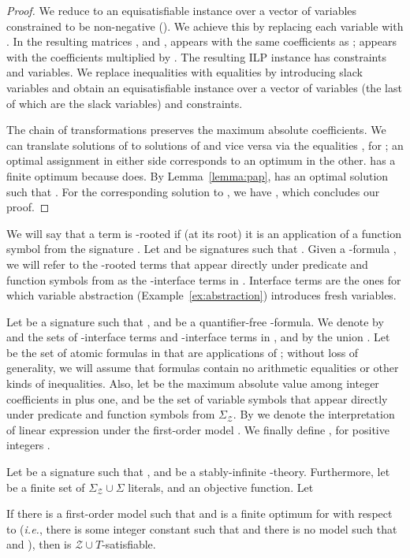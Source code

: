 \documentclass{llncs}
\newcommand{\ie}[0]{\emph{i.e.}, }
\newcommand{\ZT}[0]{\ensuremath{\mathcal{Z} \cup T}}
\newcommand{\SigmaZ}[0]{\ensuremath{\Sigma_{\mathcal{Z}}}}
\newcommand{\SigmaZT}[0]{\ensuremath{\SigmaZ{} \cup \Sigma}}
\begin{document}
\begin{proof}
  We reduce  to an equisatisfiable instance over a vector
   of  variables constrained to be non-negative
  (). We achieve this by replacing each variable
   with . In the resulting matrices , 
  and ,  appears with the same coefficients as ;  appears with the coefficients multiplied by . The
  resulting ILP instance  has  constraints and 
  variables. We replace inequalities with equalities by introducing
   slack variables and obtain an equisatisfiable instance 
  over a vector  of  variables (the last  of
  which are the slack variables) and  constraints.

  The chain of transformations preserves the maximum absolute
  coefficients. We can translate solutions of  to solutions of
   and vice versa via the equalities ,
  for ; an optimal assignment in either side
  corresponds to an optimum in the other.   has a finite optimum
  because  does. By Lemma~\ref{lemma:pap},  has an optimal
  solution  such that . For the corresponding solution  to ,
  we have , which concludes our proof.
\end{proof}

We will say that a term is -rooted if (at its root) it is an
application of a function symbol from the signature . Let
 and  be signatures such that . Given a -formula ,
we will refer to the -rooted terms that appear directly
under predicate and function symbols from  as the
-interface terms in . Interface terms are the ones for
which variable abstraction (Example~\ref{ex:abstraction}) introduces
fresh variables.

Let  be a signature such that , and  be a quantifier-free -formula. We
denote by  and  the sets of
-interface terms and -interface terms in , and by
 the union . Let 
be the set of atomic formulas in  that are applications of ;
without loss of generality, we will assume that formulas contain no
arithmetic equalities or other kinds of inequalities. Also, let
 be the maximum absolute value among integer coefficients in
 plus one, and  be the set of variable symbols that
appear directly under predicate and function symbols from
\SigmaZ{}. By  we denote the interpretation of linear expression
 under the first-order model . We finally define , for positive integers .

\begin{lemma}
  \label{lemma:ztbounds}
  Let  be a signature such that , and  be a stably-infinite -theory.
  Furthermore, let  be a finite set of \SigmaZT{} literals, and 
  an objective function. Let
  
  If there is a first-order model  such that  and  is a finite optimum for  with respect to
   (\ie there is some integer constant  such that  and there is no model  such that  and ), then  is \ZT{}-satisfiable.
\end{lemma}
\end{document}
